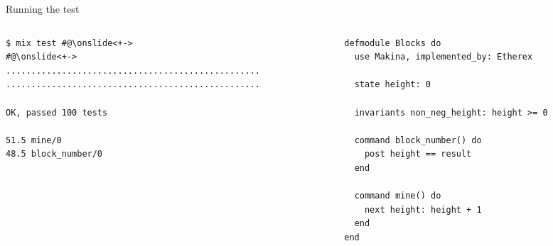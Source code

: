 \documentclass[aspectratio=169, 10pt, handout]{beamer}
\begin{document}
\begin{frame}[label={sec:org9e58103},fragile]{Running the test}
 \begin{columns}
\begin{column}{0.48\columnwidth}
\lstset{language=bash,label= ,caption= ,captionpos=b,numbers=none,style=shell}
\begin{lstlisting}
$ mix test #@\onslide<+->
#@\onslide<+->
..................................................
..................................................

OK, passed 100 tests

51.5 mine/0
48.5 block_number/0
\end{lstlisting}
\end{column}

\begin{column}{0.48\columnwidth}
\lstset{language=elixir,label= ,caption= ,captionpos=b,numbers=none,style=display}
\begin{lstlisting}
defmodule Blocks do
  use Makina, implemented_by: Etherex

  state height: 0

  invariants non_neg_height: height >= 0

  command block_number() do
    post height == result
  end

  command mine() do
    next height: height + 1
  end
end
\end{lstlisting}
\end{column}
\end{columns}
\end{frame}
\end{document}
